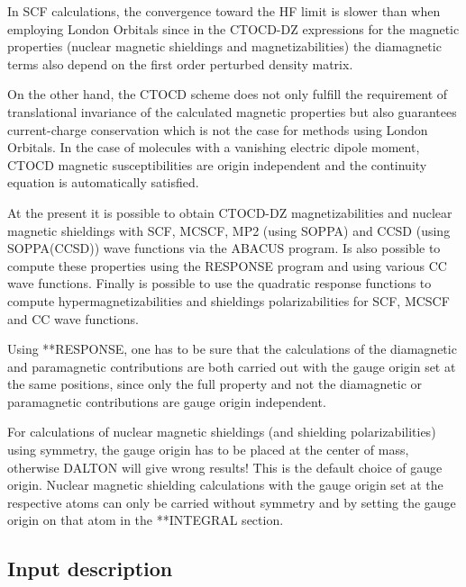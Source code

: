 In SCF calculations, the convergence toward the HF limit is slower 
than when employing London Orbitals since in the CTOCD-DZ expressions for 
the magnetic properties (nuclear magnetic shieldings and magnetizabilities) 
the diamagnetic terms also depend on the first order perturbed density matrix.

On the other hand, the CTOCD scheme does not only fulfill the requirement of
translational invariance of the calculated magnetic properties but also
guarantees current-charge conservation which is not the case for methods using
London Orbitals. In the case of molecules with a vanishing electric dipole
moment, CTOCD magnetic susceptibilities are origin independent and the
continuity equation is automatically satisfied.  

At the present it is possible to obtain CTOCD-DZ magnetizabilities and nuclear
magnetic shieldings with SCF, MCSCF, MP2 (using SOPPA) and CCSD (using
SOPPA(CCSD)) wave functions via the ABACUS program. Is also possible to
compute these properties using the RESPONSE program and using various CC wave
functions.  Finally is possible to use the quadratic response functions to
compute hypermagnetizabilities and shieldings polarizabilities for SCF, MCSCF
and CC wave functions. 

Using **RESPONSE, one has to be sure that the calculations of the diamagnetic
and paramagnetic contributions are both carried out with the gauge origin set
at the same positions, since only the full property and not the diamagnetic or
paramagnetic contributions are gauge origin independent.

For calculations of nuclear magnetic shieldings (and shielding
polarizabilities) using symmetry, the gauge origin has to be placed at the
center of mass, otherwise DALTON will give wrong results! This is the
default choice of gauge origin. Nuclear magnetic
shielding calculations with the gauge origin set at the respective atoms can
only be carried without symmetry and by setting the gauge origin on that atom
in the **INTEGRAL section. 

\subsection{Input description}\label{sec:ctocdinput}

\begin{center}
\end{center}

